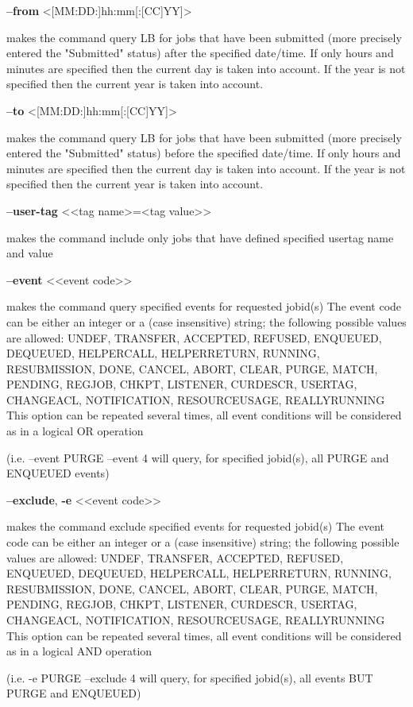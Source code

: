 {\textbf{--from} <[MM:DD:]hh:mm[:[CC]YY]>

makes the command query LB for jobs that have been submitted (more precisely entered the "Submitted" status) after the specified date/time.
If only hours and minutes are specified then the current day is taken into account. If the year is not specified then the current year is taken into account.

\textbf{--to} <[MM:DD:]hh:mm[:[CC]YY]>

makes the command query LB for jobs that have been submitted (more precisely entered the "Submitted" status) before the specified date/time.
If only hours and minutes are specified then the current day is taken into account.
If the year is not specified then the current year is taken into account.

\textbf{--user-tag} <<tag name>=<tag value>>

makes the command include only jobs that have defined specified usertag name and value

\textbf{--event} <<event code>>

makes the command query specified events for requested jobid(s)
The event code can be either an integer or a (case insensitive) string; the following possible values are allowed:
UNDEF, TRANSFER, ACCEPTED, REFUSED, ENQUEUED, DEQUEUED, HELPERCALL, HELPERRETURN, RUNNING, RESUBMISSION, DONE,
CANCEL, ABORT, CLEAR, PURGE, MATCH, PENDING, REGJOB, CHKPT, LISTENER, CURDESCR, USERTAG, CHANGEACL, NOTIFICATION,
RESOURCEUSAGE, REALLYRUNNING
This option can be repeated several times, all event conditions will be considered as in a logical OR operation

(i.e.  --event  PURGE --event 4  will query, for specified jobid(s), all PURGE and ENQUEUED events)

\textbf{--exclude}, \textbf{-e} <<event code>>

makes the command exclude specified events for requested jobid(s)
The event code can be either an integer or a (case insensitive) string; the following possible values are allowed:
UNDEF, TRANSFER, ACCEPTED, REFUSED, ENQUEUED, DEQUEUED, HELPERCALL, HELPERRETURN, RUNNING, RESUBMISSION, DONE,
CANCEL, ABORT, CLEAR, PURGE, MATCH, PENDING, REGJOB, CHKPT, LISTENER, CURDESCR, USERTAG, CHANGEACL, NOTIFICATION,
RESOURCEUSAGE, REALLYRUNNING
This option can be repeated several times, all event conditions will be considered as in a logical AND operation

(i.e.  -e PURGE --exclude 4  will query, for specified jobid(s), all events BUT PURGE and ENQUEUED)


}
